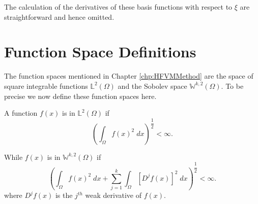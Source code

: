 The calculation of the derivatives of these basis functions with respect to $\xi$ are straightforward and hence omitted. 

\section{Function Space Definitions}
The function spaces mentioned in Chapter \ref{chp:HFVMMethod} are the space of square integrable functions $\mathbb{L}^2(\Omega)$ and the Sobolev space $\mathbb{W}^{k,2}(\Omega)$. To be precise we now define these function spaces here. 

A function $f(x)$ is in $\mathbb{L}^2(\Omega)$ if
\begin{equation*}
\left( \int_{\Omega} f(x)^2 \; dx \right)^{\dfrac{1}{2}} < \infty.
\end{equation*}

While $f(x)$ is in $\mathbb{W}^{k,2}(\Omega)$ if 
\begin{equation*}
\left( \int_{\Omega} f(x)^2 \; dx + \sum^k_{j=1}  \int_{\Omega} \left[D^j f(x) \right]^2 \; dx  \right)^{\dfrac{1}{2}} < \infty.
\end{equation*}
where $D^j f(x)$ is the $j^{th}$ weak derivative of $f(x)$. 
